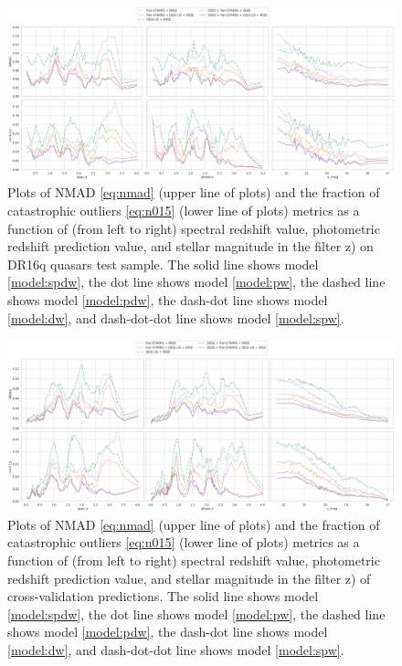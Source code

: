 \documentclass[fleqn,usenatbib]{mnras}
\begin{document}
\begin{figure}
    \centering
    \includegraphics[width=0.99\linewidth]{images/metrics-dr16q-ab-mini.png}
    \caption{Plots of NMAD \eqref{eq:nmad} (upper line of plots) and the fraction of catastrophic outliers \eqref{eq:n015} (lower line of plots) metrics as a function of (from left to right) spectral redshift value, photometric redshift prediction value, and stellar magnitude in the filter z) on DR16q quasars test sample. The solid line shows model \ref{model:spdw}, the dot line shows model \ref{model:pw}, the dashed line shows model \ref{model:pdw}, the dash-dot line shows model \ref{model:dw}, and dash-dot-dot line shows model \ref{model:spw}.}
    \label{fig:metrics-dr16q}
\end{figure}

\begin{figure}
    \centering
    \includegraphics[width=0.99\linewidth]{images/metrics-cv2-ab-mini.png}
    \caption{Plots of NMAD \eqref{eq:nmad} (upper line of plots) and the fraction of catastrophic outliers \eqref{eq:n015} (lower line of plots) metrics as a function of (from left to right) spectral redshift value, photometric redshift prediction value, and stellar magnitude in the filter z) of cross-validation predictions. The solid line shows model \ref{model:spdw}, the dot line shows model \ref{model:pw}, the dashed line shows model \ref{model:pdw}, the dash-dot line shows model \ref{model:dw}, and dash-dot-dot line shows model \ref{model:spw}.}
    \label{fig:metrics-cv2-total}
\end{figure}
\end{document}
